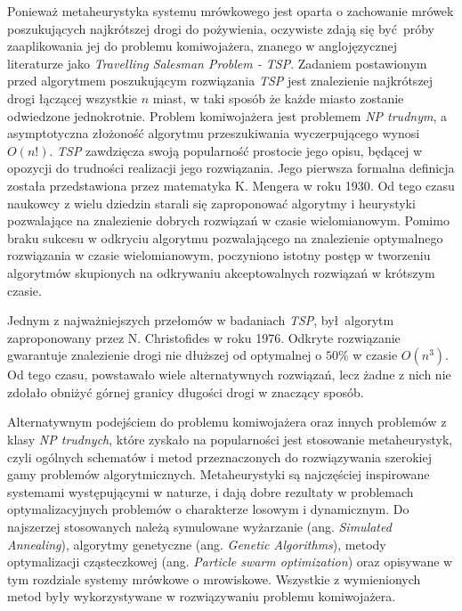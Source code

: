 {    %
    Ponieważ metaheurystyka systemu mrówkowego jest oparta o zachowanie mrówek poszukujących najkrótszej drogi do
    pożywienia, oczywiste zdają się być próby zaaplikowania jej do problemu komiwojażera, znanego w anglojęzycznej
    literaturze jako \textit{Travelling Salesman Problem - TSP}. Zadaniem postawionym przed algorytmem poszukującym
    rozwiązania \textit{TSP} jest znalezienie najkrótszej drogi łączącej wszystkie $n$ miast, w taki sposób że każde
    miasto zostanie odwiedzone jednokrotnie. Problem komiwojażera jest problemem \textit{NP trudnym}, a asymptotyczna
    złożoność algorytmu przeszukiwania wyczerpującego wynosi $O(n!)$. \textit{TSP} zawdzięcza swoją popularność
    prostocie jego opisu, będącej w opozycji do trudności realizacji jego rozwiązania. Jego pierwsza formalna definicja
    została przedstawiona przez matematyka K. Mengera w roku 1930\cite{Mazidi2017MetaHeuristicAF}. Od tego czasu
    naukowcy z wielu dziedzin starali się zaproponować algorytmy i heurystyki pozwalające na znalezienie dobrych
    rozwiązań w czasie wielomianowym. Pomimo braku sukcesu w odkryciu algorytmu pozwalającego na znalezienie optymalnego
    rozwiązania w czasie wielomianowym, poczyniono istotny postęp w tworzeniu algorytmów skupionych na odkrywaniu
    akceptowalnych rozwiązań w krótszym czasie.

    Jednym z najważniejszych przełomów w badaniach \textit{TSP}, był algorytm zaproponowany przez N. Christofides w roku
    1976. Odkryte rozwiązanie gwarantuje znalezienie drogi nie dłuższej od optymalnej o $50\%$ w czasie
    $O(n^3)$\cite{Christofides1976WorstCaseAO}. Od tego czasu, powstawało wiele alternatywnych rozwiązań, lecz żadne z
    nich nie zdołało obniżyć górnej granicy długości drogi w znaczący sposób.

    Alternatywnym podejściem do problemu komiwojażera oraz innych problemów z klasy \textit{NP trudnych}, które zyskało
    na popularności jest stosowanie metaheurystyk, czyli ogólnych schematów i metod przeznaczonych do rozwiązywania
    szerokiej gamy problemów algorytmicznych. Metaheurystyki są najczęściej inspirowane systemami występującymi w
    naturze, i dają dobre rezultaty w problemach optymalizacyjnych problemów o charakterze losowym i
    dynamicznym\cite{Bianchi2008ASO}. Do najszerzej stosowanych należą symulowane wyżarzanie (ang. \textit{Simulated
    Annealing})\cite{Kirkpatrick1983OptimizationBS}, algorytmy genetyczne (ang. \textit{Genetic
    Algorithms})\cite{Fraser1957SimulationOG}, metody optymalizacji cząsteczkowej (ang. \textit{Particle swarm
    optimization})\cite{Poli2007ParticleSO} oraz opisywane w tym rozdziale systemy mrówkowe o mrowiskowe. Wszystkie z
    wymienionych metod były wykorzystywane w rozwiązywaniu problemu komiwojażera\cite{Prabakaran2019ASO,
    Mazidi2017MetaHeuristicAF}.

}
